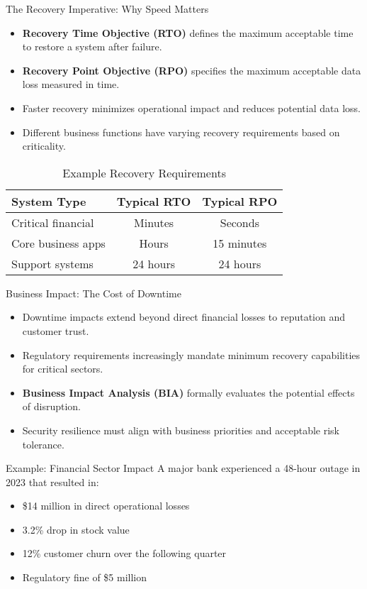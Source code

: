 \documentclass{beamer}
\begin{document}
\begin{frame}{The Recovery Imperative: Why Speed Matters}
    \begin{itemize}
        \item \textbf{Recovery Time Objective (RTO)} defines the maximum acceptable time to restore a system after failure.
        \item \textbf{Recovery Point Objective (RPO)} specifies the maximum acceptable data loss measured in time.
        \item Faster recovery minimizes operational impact and reduces potential data loss.
        \item Different business functions have varying recovery requirements based on criticality.
    \end{itemize}
    
    \begin{table}
        \begin{tabular}{lcc}
            \toprule
            \textbf{System Type} & \textbf{Typical RTO} & \textbf{Typical RPO} \\
            \midrule
            Critical financial & Minutes & Seconds \\
            Core business apps & Hours & 15 minutes \\
            Support systems & 24 hours & 24 hours \\
            \bottomrule
        \end{tabular}
        \caption{Example Recovery Requirements}
    \end{table}
\end{frame}

\begin{frame}{Business Impact: The Cost of Downtime}
    \begin{itemize}
        \item Downtime impacts extend beyond direct financial losses to reputation and customer trust.
        \item Regulatory requirements increasingly mandate minimum recovery capabilities for critical sectors.
        \item \textbf{Business Impact Analysis (BIA)} formally evaluates the potential effects of disruption.
        \item Security resilience must align with business priorities and acceptable risk tolerance.
    \end{itemize}
    
    \begin{exampleblock}{Example: Financial Sector Impact}
        A major bank experienced a 48-hour outage in 2023 that resulted in:
        \begin{itemize}
            \item \$14 million in direct operational losses
            \item 3.2\% drop in stock value
            \item 12\% customer churn over the following quarter
            \item Regulatory fine of \$5 million
        \end{itemize}
    \end{exampleblock}
\end{frame}
\end{document}
